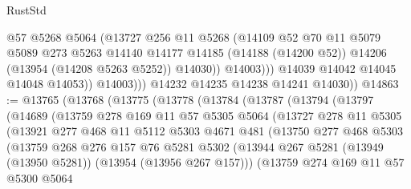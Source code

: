 \begin{lexlean}{RustStd}
\begin{coremodule}
                        @57
                        @5268
                        @5064
                        (@13727
                          @256
                          @11
                          @5268
                          (@14109
                            @52
                            @70
                            @11
                            @5079
                            @5089
                            @273
                            @5263
                            @14140
                            @14177
                            @14185
                            (@14188 (@14200 @52))
                            @14206
                            (@13954 (@14208 @5263 @5252))
                            @14030))
                        @14003)))
                  @14039
                  @14042
                  @14045
                  @14048
                  @14053))
              @14003)))
        @14232
        @14235
        @14238
        @14241
        @14030))
@14863 := @13765
    (@13768
      (@13775
        (@13778
          (@13784
            (@13787
              (@13794
                (@13797
                  (@14689
                    (@13759
                      @278
                      @169
                      @11
                      @57
                      @5305
                      @5064
                      (@13727
                        @278
                        @11
                        @5305
                        (@13921
                          @277
                          @468
                          @11
                          @5112
                          @5303
                          @4671
                          @481
                          (@13750
                            @277
                            @468
                            @5303
                            (@13759
                              @268
                              @276
                              @157
                              @76
                              @5281
                              @5302
                              (@13944
                                @267
                                @5281
                                (@13949 (@13950 @5281))
                                (@13954 (@13956 @267 @157)))
                              (@13759
                                @274
                                @169
                                @11
                                @57
                                @5300
                                @5064

\end{coremodule}
\end{lexlean}
